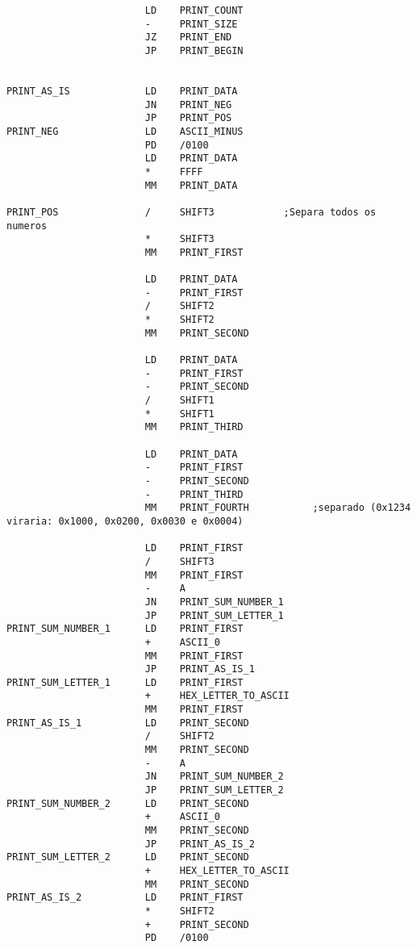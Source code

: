 \begin{lstlisting}
                        LD    PRINT_COUNT
                        -     PRINT_SIZE
                        JZ    PRINT_END
                        JP    PRINT_BEGIN


PRINT_AS_IS             LD    PRINT_DATA
                        JN    PRINT_NEG
                        JP    PRINT_POS
PRINT_NEG               LD    ASCII_MINUS
                        PD    /0100
                        LD    PRINT_DATA
                        *     FFFF
                        MM    PRINT_DATA

PRINT_POS               /     SHIFT3            ;Separa todos os numeros
                        *     SHIFT3
                        MM    PRINT_FIRST

                        LD    PRINT_DATA
                        -     PRINT_FIRST
                        /     SHIFT2
                        *     SHIFT2
                        MM    PRINT_SECOND

                        LD    PRINT_DATA
                        -     PRINT_FIRST
                        -     PRINT_SECOND
                        /     SHIFT1
                        *     SHIFT1
                        MM    PRINT_THIRD

                        LD    PRINT_DATA
                        -     PRINT_FIRST
                        -     PRINT_SECOND
                        -     PRINT_THIRD
                        MM    PRINT_FOURTH           ;separado (0x1234 viraria: 0x1000, 0x0200, 0x0030 e 0x0004)
                        
                        LD    PRINT_FIRST
                        /     SHIFT3
                        MM    PRINT_FIRST
                        -     A
                        JN    PRINT_SUM_NUMBER_1
                        JP    PRINT_SUM_LETTER_1
PRINT_SUM_NUMBER_1      LD    PRINT_FIRST 
                        +     ASCII_0
                        MM    PRINT_FIRST
                        JP    PRINT_AS_IS_1
PRINT_SUM_LETTER_1      LD    PRINT_FIRST 
                        +     HEX_LETTER_TO_ASCII
                        MM    PRINT_FIRST
PRINT_AS_IS_1           LD    PRINT_SECOND
                        /     SHIFT2
                        MM    PRINT_SECOND
                        -     A
                        JN    PRINT_SUM_NUMBER_2
                        JP    PRINT_SUM_LETTER_2
PRINT_SUM_NUMBER_2      LD    PRINT_SECOND
                        +     ASCII_0
                        MM    PRINT_SECOND
                        JP    PRINT_AS_IS_2
PRINT_SUM_LETTER_2      LD    PRINT_SECOND
                        +     HEX_LETTER_TO_ASCII
                        MM    PRINT_SECOND
PRINT_AS_IS_2           LD    PRINT_FIRST
                        *     SHIFT2
                        +     PRINT_SECOND
                        PD    /0100


\end{lstlisting}

